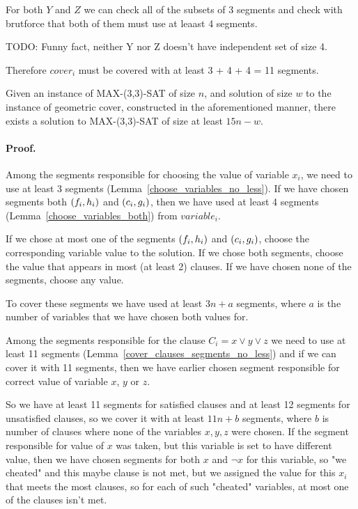 For both $Y$ and $Z$ we can check all of the subsets of 3 segments and
check with brutforce that both of them must use at leaast 4 segments.

TODO: Funny fact, neither Y nor Z doesn't have independent set of size 4.

Therefore $cover_i$ must be covered with at least 3 + 4 + 4 = 11 segments.

\begin{lemma}
	\label{construction_completness}
	Given an instance of MAX-(3,3)-SAT of size $n$,
	and solution of size $w$ to the instance of geometric cover,
	constructed in the aforementioned manner, 
	there exists a solution to MAX-(3,3)-SAT of size at least $15n - w$.
\end{lemma}
\paragraph{Proof.}
Among the segments responsible for choosing the value of variable $x_i$,
we need to use at least 3 segments (Lemma~\ref{choose_variables_no_less}).
If we have chosen segments both $(f_i, h_i)$ and $(c_i, g_i)$,
then we have used at least 4 segments (Lemma~\ref{choose_variables_both})
from $variable_i$.

If we chose at most one of the segments $(f_i, h_i)$ and $(c_i, g_i)$,
choose the corresponding variable value to the solution.
If we chose both segments,
choose the value that appears in most (at least 2) clauses.
If we have chosen none of the segments, choose any value.

To cover these segments we have used at least $3n + a$ segments,
where $a$ is the number of variables that we have chosen both
values for.

Among the segments responsible for the clause $C_i = x \lor y \lor z$
we need to use at least 11 segments
(Lemma~\ref{cover_clauses_segments_no_less})
and if we can cover it with 11 segments, then we have 
earlier chosen
segment responsible for correct value of variable $x$, $y$ or $z$.

So we have at least 11 segments for satisfied clauses
and at least 12 segments
for unsatisfied clauses, so we cover it with 
at least $11n + b$ segments, where $b$ is number of clauses
where none of the variables $x, y, z$ were chosen.
If the segment responsible for value of $x$ was taken,
but this variable is set to have different value,
then we have chosen segments for both $x$ and $\neg x$ for this variable,
so "we cheated" and this maybe clause is not met,
but we assigned the value for this $x_i$ that meets
the most clauses, so for each of such "cheated" variables,
at most one of the clauses isn't met.

